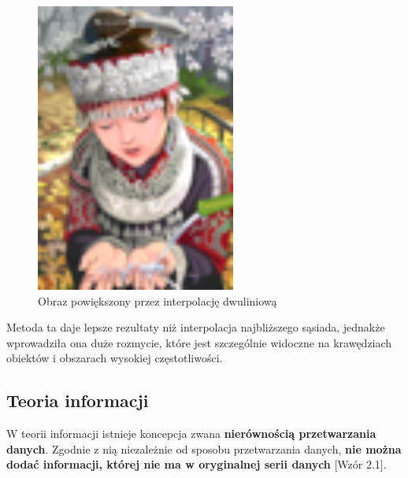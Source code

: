 \begin{figure}[ht]
\begin{minipage}[t]{0.33\linewidth}
        \includegraphics[width=\linewidth]{Rozdziały/02.Podstawy_teoretyczne/Obrazy/comic_BILINEARx4.png}
        \caption{Obraz powiększony przez interpolację dwuliniową}
        \label{fig:image10}
    \end{minipage}
\end{figure}


Metoda ta daje lepsze rezultaty niż interpolacja najbliższego sąsiada, jednakże wprowadziła ona duże rozmycie, które jest szczególnie widoczne na krawędziach obiektów i obszarach wysokiej częstotliwości.

\subsection*{Teoria informacji}

W teorii informacji istnieje koncepcja zwana \textbf{nierównością przetwarzania danych}. Zgodnie z nią niezależnie od sposobu przetwarzania danych, \textbf{nie można dodać informacji, której nie ma w oryginalnej serii danych}  [Wzór 2.1].

